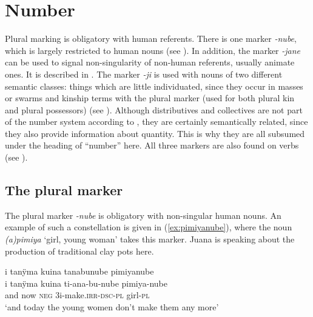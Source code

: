 
\section{Number}\label{sec:NumberNouns}

Plural marking is obligatory with human referents. There is one  marker \textit{-nube}, which is largely restricted to human nouns (see ). In addition, the  marker \textit{-jane} can be used to signal non-singularity of non-human referents, usually animate ones. It is described in . The  marker \textit{-ji} is used with nouns of two different semantic classes: things which are little individuated, since they occur in masses or swarms and kinship terms with the plural marker (used for both plural kin and plural possessors) (see ). Although distributives and collectives are not part of the number system according to \citet[117, 119, 120]{Corbett2000}, they are certainly semantically related, since they also provide information about quantity. This is why they are all subsumed under the heading of “number” here. All three markers are also found on verbs (see ).

\subsection{The plural marker}\label{sec:NounsPL-nube}

The plural marker \textit{-nube} is obligatory with non-singular human nouns. An example of such a constellation is given in (\ref{ex:pimiyanube}), where the noun \textit{(a)pimiya} ‘girl, young woman’ takes this marker.
Juana is speaking about the production of traditional clay pots here.

\ea\label{ex:pimiyanube}
\begingl 
\glpreamble i tanÿma kuina tanabunube pimiyanube\\
\gla i tanÿma kuina ti-ana-bu-nube pimiya-nube\\ 
\glb and now \textsc{neg} 3i-make.\textsc{irr}-\textsc{dsc}-\textsc{pl} girl-\textsc{pl}\\ 
\glft ‘and today the young women don’t make them any more’\\ 
\endgl
\trailingcitation{[jxx-p120430l-2.547]}
\xe


